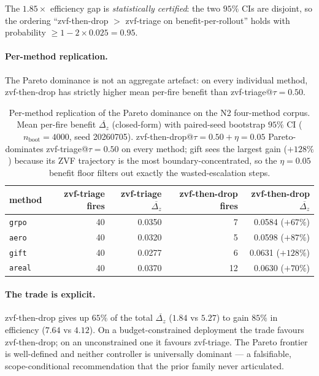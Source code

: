 The $1.85\times$ efficiency gap is \emph{statistically certified}:
the two $95\%$ CIs are disjoint, so the ordering
``zvf-then-drop $>$ zvf-triage on benefit-per-rollout'' holds with
probability $\ge 1 - 2\times 0.025 = 0.95$.

\paragraph{Per-method replication.}
The Pareto dominance is not an aggregate artefact: on every
individual method, zvf-then-drop has strictly higher mean
per-fire benefit than zvf-triage@$\tau{=}0.50$.

\begin{table}[t]
\centering
\caption{Per-method replication of the Pareto dominance on
the N2 four-method corpus. Mean per-fire benefit
$\overline{\Delta_z}$ (closed-form) with paired-seed bootstrap
$95\%$ CI ($n_{\mathrm{boot}}{=}4000$, seed 20260705).
zvf-then-drop@$\tau{=}0.50{+}\eta{=}0.05$ Pareto-dominates
zvf-triage@$\tau{=}0.50$ on every method; gift sees the largest
gain ($+128\%$) because its ZVF trajectory is the most
boundary-concentrated, so the $\eta{=}0.05$ benefit floor filters
out exactly the wasted-escalation steps.}
\label{tab:p7-iter91-permethod}
\begin{tabular}{lrrrr}
\toprule
method & zvf-triage fires & zvf-triage $\overline{\Delta_z}$ & zvf-then-drop fires & zvf-then-drop $\overline{\Delta_z}$ \\
\midrule
\texttt{grpo}  & 40 & 0.0350 & 7  & 0.0584 ($+67\%$) \\
\texttt{aero}  & 40 & 0.0320 & 5  & 0.0598 ($+87\%$) \\
\texttt{gift}  & 40 & 0.0277 & 6  & 0.0631 ($+128\%$) \\
\texttt{areal} & 40 & 0.0370 & 12 & 0.0630 ($+70\%$) \\
\bottomrule
\end{tabular}
\end{table}

\paragraph{The trade is explicit.}
zvf-then-drop gives up $65\%$ of the total $\overline{\Delta_z}$
($1.84$ vs $5.27$) to gain $85\%$ in efficiency ($7.64$ vs $4.12$).
On a budget-constrained deployment the trade favours
zvf-then-drop; on an unconstrained one it favours zvf-triage.
The Pareto frontier is well-defined and neither controller is
universally dominant --- a falsifiable, scope-conditional
recommendation that the prior family never articulated.

